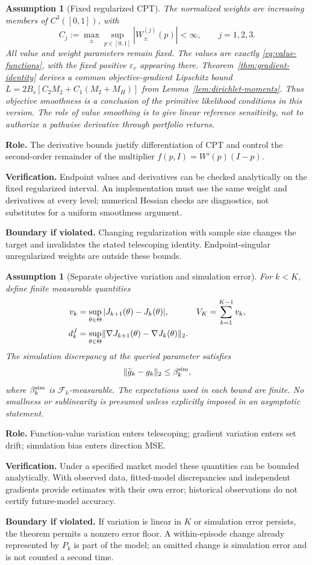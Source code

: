 \documentclass[11pt]{article}
\newtheorem{assumption}[theorem]{Assumption}
\newcommand{\1}{\mathbf 1}
\DeclarePairedDelimiter{\norm}{\lVert}{\rVert}
\newcommand{\cF}{\mathcal F}
\newcommand{\eps}{\varepsilon}
\theoremstyle{definition}
\newcommand{\assess}[3]{\par\noindent\textbf{Role.} #1\par\noindent\textbf{Verification.} #2\par\noindent\textbf{Boundary if violated.} #3\par\medskip}
\begin{document}
\begin{assumption}[Fixed regularized CPT]\label{ass:smooth-cpt}
The normalized weights are increasing members of $C^3([0,1])$, with
\[
 C_j:=\max_{\pm}\sup_{p\in[0,1]}|W_\pm^{(j)}(p)|<\infty,
 \qquad j=1,2,3.
\]
All value and weight parameters remain fixed. The values are exactly \eqref{eq:value-functions}, with the fixed positive $\eps_v$ appearing there. Theorem~\ref{thm:gradient-identity} derives a common objective-gradient Lipschitz bound $L=2B_v[C_2M_2+C_1(M_2+M_H)]$ from Lemma~\ref{lem:dirichlet-moments}. Thus objective smoothness is a conclusion of the primitive likelihood conditions in this version. The role of value smoothing is to give linear reference sensitivity, not to authorize a pathwise derivative through portfolio returns.
\end{assumption}
\assess{The derivative bounds justify differentiation of CPT and control the second-order remainder of the multiplier $f(p,I)=W'(p)(I-p)$.}{Endpoint values and derivatives can be checked analytically on the fixed regularized interval. An implementation must use the same weight and derivatives at every level; numerical Hessian checks are diagnostics, not substitutes for a uniform smoothness argument.}{Changing regularization with sample size changes the target and invalidates the stated telescoping identity. Endpoint-singular unregularized weights are outside these bounds.}

\begin{assumption}[Separate objective variation and simulation error]\label{ass:drift}
For $k<K$, define finite measurable quantities
\begin{align}
 v_k&=\sup_{\theta\in\Theta}|J_{k+1}(\theta)-J_k(\theta)|,
 &V_K&=\sum_{k=1}^{K-1}v_k,\label{eq:value-drift}\\
 d_k^J&=\sup_{\theta\in\Theta}
 \norm{\nabla J_{k+1}(\theta)-\nabla J_k(\theta)}_2.&&\label{eq:gradient-drift}
\end{align}
The simulation discrepancy at the queried parameter satisfies
\begin{equation}\label{eq:simulation-bias}
 \norm{\widetilde g_k-g_k}_2\le\beta_k^{\rm sim},
\end{equation}
where $\beta_k^{\rm sim}$ is $\cF_k$-measurable. The expectations used in each bound are finite. No smallness or sublinearity is presumed unless explicitly imposed in an asymptotic statement.
\end{assumption}
\assess{Function-value variation enters telescoping; gradient variation enters set drift; simulation bias enters direction MSE.}{Under a specified market model these quantities can be bounded analytically. With observed data, fitted-model discrepancies and independent gradients provide estimates with their own error; historical observations do not certify future-model accuracy.}{If variation is linear in $K$ or simulation error persists, the theorem permits a nonzero error floor. A within-episode change already represented by $P_k$ is part of the model; an omitted change is simulation error and is not counted a second time.}
\end{document}
